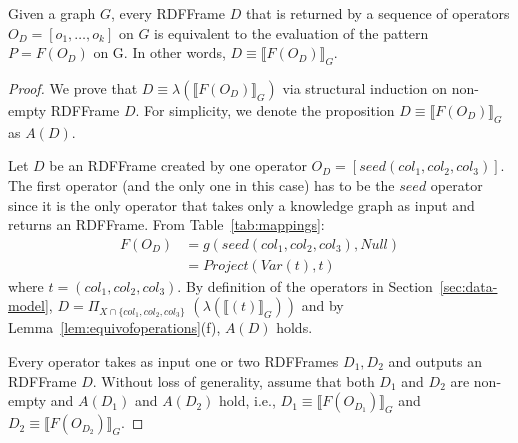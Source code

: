 \vspace*{-4pt}
\begin{sloppypar}
\begin{theorem}
	Given a graph $G$, every RDFFrame $D$ that is returned by a sequence of \rdfframes operators $O_D = [o_1, \dots, o_k]$ on $G$ is equivalent to the evaluation of the \sparql pattern $P = F(O_D)$ on G. 
	In other words, $D\equiv\llbracket F(O_D)\rrbracket_G$.
\end{theorem}
\end{sloppypar}

\begin{proof}
We prove that $D\equiv\lambda(\llbracket F(O_D)\rrbracket_G)$ via structural induction on non-empty RDFFrame $D$.
For simplicity, we denote the proposition $D\equiv\llbracket F(O_D)\rrbracket_G$ as $A(D)$.

 Let $D$ be an RDFFrame created by one \rdfframes operator $O_D = [seed(col_1, col_2, col_3)]$. The first operator (and the only one in this case) has to be the $seed$ operator since it is the only operator that takes only a knowledge graph as input and returns an RDFFrame. From Table~\ref{tab:mappings}:
\begin{align*}
    F(O_D) &= g(seed(col_1, col_2, col_3), Null) \\
          &=Project(Var(t),t)
\end{align*}
\noindent where $t = (col_1, col_2, col_3)$. By definition of the \rdfframes operators in Section~\ref{sec:data-model}, $D = \Pi_{X \cap \{col_1, col_2, col_3\}}$ $(\lambda(\llbracket (t) \rrbracket_G))$ and by Lemma~\ref{lem:equivofoperations}(f), $A(D)$ holds.

 Every \rdfframes operator takes as input one or two RDFFrames $D_1, D_2$ and outputs an RDFFrame $D$. 
Without loss of generality, assume that both $D_1$ and $D_2$ are non-empty and $A(D_1)$ and $A(D_2)$ hold, i.e., $D_1\equiv\llbracket F(O_{D_1})\rrbracket_G$ and 
$D_2\equiv\llbracket F(O_{D_2})\rrbracket_G$.


\end{proof}
